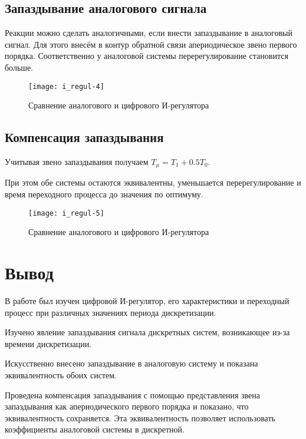    \subsection{Запаздывание аналогового сигнала}
    Реакции можно сделать аналогичными, если внести запаздывание в аналоговый сигнал.
    Для этого внесём в контур обратной связи апериодическое звено первого порядка. Соответственно у аналоговой системы перерегулирование
    становится больше.
    \begin{figure}[H]
        \centering\texttt{[image: i\_regul-4]}
        \caption{Сравнение аналогового и цифрового И-регулятора}
    \end{figure}

    \subsection{Компенсация запаздывания}
    Учитывая звено запаздывания получаем $T_\mu = T_1 + 0.5T_0$.

    При этом обе системы остаются эквивалентны, уменьшается перерегулирование и время переходного процесса до значения по оптимуму.
    \begin{figure}[H]
        \centering\texttt{[image: i\_regul-5]}
        \caption{Сравнение аналогового и цифрового И-регулятора}
    \end{figure}


    \section{Вывод}
    В работе был изучен цифровой И-регулятор, его характеристики и переходный процесс при различных значениях периода дискретизации.
    
    Изучено явление запаздывания сигнала дискретных систем, возникающее из-за времени дискретизации.
    
    Искусственно внесено запаздывание в аналоговую систему и показана эквивалентность обоих систем. 
    
    Проведена компенсация запаздывания с помощью представления звена запаздывания как
    апериодического первого порядка и показано, что эквивалентность сохраняется.
    Эта эквивалентность позволяет использовать коэффициенты аналоговой системы в дискретной.

